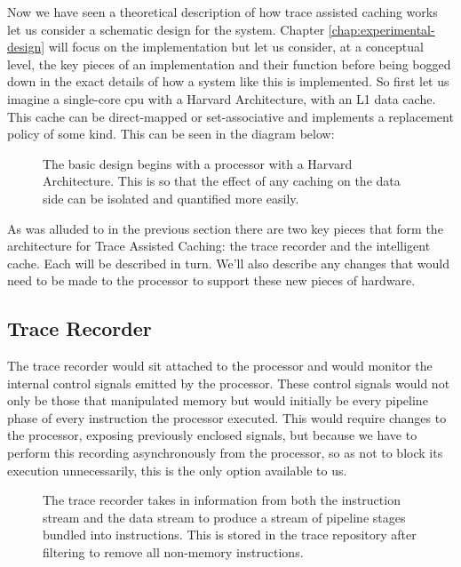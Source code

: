 Now we have seen a theoretical description of how trace assisted caching works let us consider a schematic design for the system. Chapter \ref{chap:experimental-design} will focus on the implementation but let us consider, at a conceptual level, the key pieces of an implementation and their function before being bogged down in the exact details of how a system like this is implemented. So first let us imagine a single-core \gls{cpu} with a Harvard Architecture, with an L1 data cache. This cache can be direct-mapped or set-associative and implements a replacement policy of some kind. This can be seen in the diagram below:

\begin{figure}
	
	\caption{The basic design begins with a processor with a Harvard Architecture. This is so that the effect of any caching on the data side can be isolated and quantified more easily.}
\end{figure}

As was alluded to in the previous section there are two key pieces that form the architecture for Trace Assisted Caching: the trace recorder and the intelligent cache. Each will be described in turn. We'll also describe any changes that would need to be made to the processor to support these new pieces of hardware.

\subsection{Trace Recorder}

The trace recorder would sit attached to the processor and would monitor the internal control signals emitted by the processor. These control signals would not only be those that manipulated memory but would initially be every pipeline phase of every instruction the processor executed. This would require changes to the processor, exposing previously enclosed signals, but because we have to perform this recording asynchronously from the processor, so as not to block its execution unnecessarily, this is the only option available to us.

\begin{figure}
	
	\caption{The trace recorder takes in information from both the instruction stream and the data stream to produce a stream of pipeline stages bundled into instructions. This is stored in the trace repository after filtering to remove all non-memory instructions.}
\end{figure}

